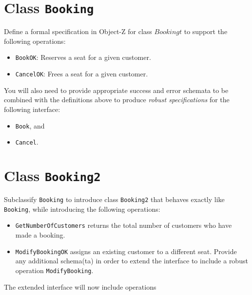 \documentclass[12pt]{article}
\begin{document}
\section*{Class \texttt{Booking}}

Define a formal specification in Object-Z for class $Bookingt$ to  support the following operations:

\begin{itemize}

\item \texttt{BookOK}: Reserves a seat for a given customer.

\item \texttt{CancelOK}:  Frees a seat for a given customer.

\end{itemize}

\noindent You will also need to provide appropriate success and error schemata to be combined with the definitions above to produce \textit{robust specifications} for the following interface:

\begin{itemize}

\item \texttt{Book}, and

\item \texttt{Cancel}.

\end{itemize}

\section*{Class \texttt{Booking2}}

Subclassify \texttt{Booking} to introduce class \texttt{Booking2} that behaves exactly like \texttt{Booking}, while introducing the following operations:

\begin{itemize}

\item \texttt{GetNumberOfCustomers} returns the total number of customers who have made a booking.

\item \texttt{ModifyBookingOK} assigns an existing customer to a different seat. Provide any additional schema(ta) in order to extend the interface to include a robust operation \texttt{ModifyBooking}.

\end{itemize}

\noindent The extended interface will now include operations
\end{document}
